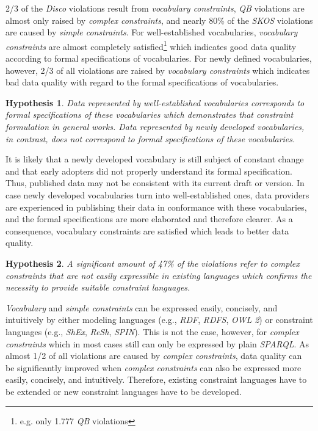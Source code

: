 \documentclass{llncs}
\newtheorem{hyp}{Hypothesis}
\begin{document}
{{2/3 of the \emph{Disco} violations result from \emph{vocabulary constraints},
\emph{QB} violations are almost only raised by \emph{complex constraints}, and 
nearly 80\% of the \emph{SKOS} violations are caused by \emph{simple constraints}.
For well-established vocabularies, \emph{vocabulary constraints} are almost completely satisfied\footnote{e.g. only 1.777 \emph{QB} violations} which indicates good data quality according to formal specifications of vocabularies.
For newly defined vocabularies, however, 2/3 of all violations are raised by \emph{vocabulary constraints}
which indicates bad data quality with regard to the formal specifications of vocabularies.

\begin{hyp}
Data represented by well-established vocabularies corresponds to formal specifications of these vocabularies which demonstrates that constraint formulation in general works. 
Data represented by newly developed vocabularies, in contrast, does not correspond to formal specifications of these vocabularies.
\end{hyp}

It is likely that a newly developed vocabulary is still subject of constant change
and that early adopters did not properly understand its formal specification.
Thus, published data may not be consistent with its current draft or version.
In case newly developed vocabularies turn into well-established ones,
data providers are experienced in publishing their data in conformance with these vocabularies, 
and the formal specifications are more elaborated and therefore clearer. 
As a consequence, vocabulary constraints are satisfied which leads to better data quality.  

\begin{hyp}
A significant amount of 47\% of the violations refer to complex constraints that are not easily expressible in existing languages which confirms the necessity to provide suitable constraint languages.
\end{hyp} 
\emph{Vocabulary} and \emph{simple constraints} can be expressed easily, concisely, and intuitively by either modeling languages (e.g., \emph{RDF}, \emph{RDFS}, \emph{OWL 2}) or constraint languages (e.g., \emph{ShEx}, \emph{ReSh}, \emph{SPIN}). 
This is not the case, however, for \emph{complex constraints} which in most cases still can only be expressed by plain \emph{SPARQL}. 
As almost 1/2 of all violations are caused by \emph{complex constraints}, 
data quality can be significantly improved when \emph{complex constraints} can also be expressed more easily, concisely, and intuitively.
Therefore, existing constraint languages have to be extended or new constraint languages have to be developed.

}}
\end{document}
